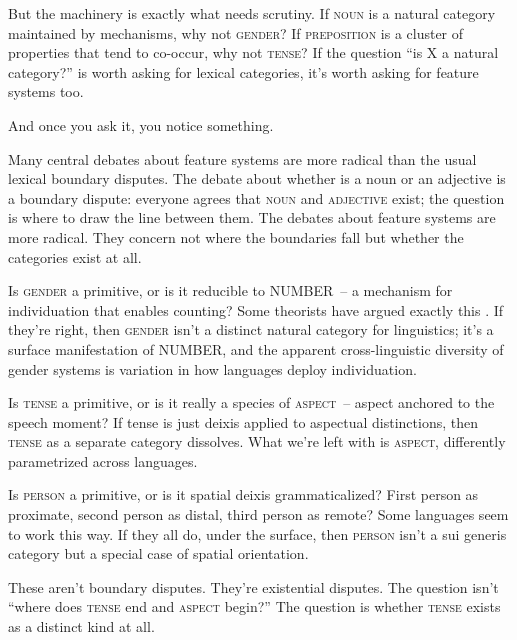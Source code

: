But the machinery is exactly what needs scrutiny. If \textsc{noun} is a natural category maintained by mechanisms, why not \textsc{gender}? If \textsc{preposition} is a cluster of properties that tend to co-occur, why not \textsc{tense}? If the question \enquote{is X a natural category?} is worth asking for lexical categories, it's worth asking for feature systems too.

And once you ask it, you notice something.

Many central debates about feature systems are more radical than the usual lexical boundary disputes. The debate about whether  is a noun or an adjective is a boundary dispute: everyone agrees that \textsc{noun} and \textsc{adjective} exist; the question is where to draw the line between them. The debates about feature systems are more radical. They concern not where the boundaries fall but whether the categories exist at all.

Is \textsc{gender} a primitive, or is it reducible to NUMBER~-- a mechanism for individuation that enables counting? Some theorists have argued exactly this \citep{picallo1991,lowenstamm2008}. If they're right, then \textsc{gender} isn't a distinct natural category for linguistics; it's a surface manifestation of NUMBER, and the apparent cross-linguistic diversity of gender systems is variation in how languages deploy individuation.

Is \textsc{tense} a primitive, or is it really a species of \textsc{aspect}~-- aspect anchored to the speech moment? If tense is just deixis applied to aspectual distinctions, then \textsc{tense} as a separate category dissolves. What we're left with is \textsc{aspect}, differently parametrized across languages.

Is \textsc{person} a primitive, or is it spatial deixis grammaticalized? First person as proximate, second person as distal, third person as remote? Some languages seem to work this way. If they all do, under the surface, then \textsc{person} isn't a sui generis category but a special case of spatial orientation.

These aren't boundary disputes. They're existential disputes. The question isn't \enquote{where does \textsc{tense} end and \textsc{aspect} begin?} The question is whether \textsc{tense} exists as a distinct kind at all.

